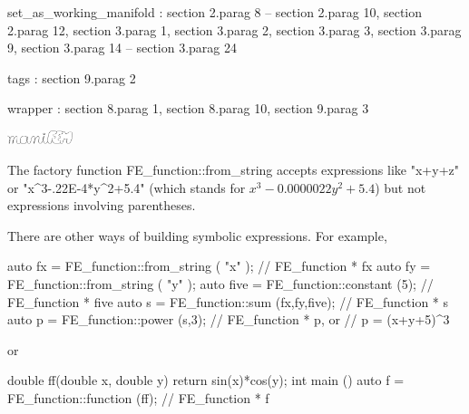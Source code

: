 {\codett set\_as\_working\_manifold} : \numb section 2.\numb parag 8 --
\numb section 2.\numb parag 10, \numb section 2.\numb parag 12, \numb section 3.\numb parag 1,
\numb section 3.\numb parag 2, \numb section 3.\numb parag 3, \numb section 3.\numb parag 9,
\numb section 3.\numb parag 14 -- \numb section 3.\numb parag 24

{\codett tag}s : \numb section 9.\numb parag 2

wrapper : \numb section 8.\numb parag 1, \numb section 8.\numb parag 10, \numb section 9.\numb parag 3


\bye
















\hbox{\includegraphics[width=19mm]{manifem-small.eps}}


The factory function {\codett FE\_function::from\_string} accepts expressions like {\codett "x+y+z"} or
{\codett "x\^{}3-.22E-4*y\^{}2+5.4"} (which stands for $ x^3 - 0.0000022y^2+5.4$) 
but not expressions involving parentheses.

There are other ways of building symbolic expressions.
For example,

\verbatim
   auto fx = FE_function::from_string ( "x" ); // FE_function * fx
   auto fy = FE_function::from_string ( "y" );
   auto five = FE_function::constant (5); // FE_function * five
   auto s = FE_function::sum (fx,fy,five); // FE_function * s
   auto p = FE_function::power (s,3); // FE_function * p, or
   // p = (x+y+5)^3
\endverbatim

\noindent or

\verbatim
double ff(double x, double y) { return sin(x)*cos(y); }
int main () {
   auto f = FE_function::function (ff); // FE_function * f
}\endverbatim















